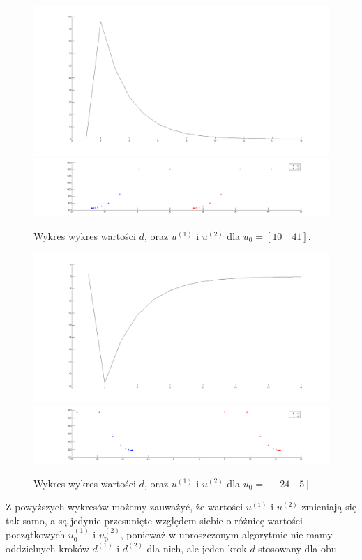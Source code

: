\documentclass[a4paper,10pt]{article}
\begin{document}
\begin{figure}[!h]
    \centering
	\includegraphics[width=120mm]{CW4-alg1fun1-u10_41-k01-d.png}
	\includegraphics[width=120mm]{CW4-alg1fun1-u10_41-k01-u.png}
	\caption{Wykres wykres wartości $d$, oraz $u^{(1)}$ i $u^{(2)}$ dla $u_0=[10 \quad 41]$.}
    \label{fig:Rysunek}
\end{figure}
\begin{figure}[!h]
    \centering
	\includegraphics[width=120mm]{CW4-alg1fun1-u-24_5-k01-d.png}
	\includegraphics[width=120mm]{CW4-alg1fun1-u-24_5-k01-u.png}
	\caption{Wykres wykres wartości $d$, oraz $u^{(1)}$ i $u^{(2)}$ dla $u_0=[-24 \quad 5]$.}
    \label{fig:Rysunek}
\end{figure}

\newpage Z powyższych wykresów możemy zauważyć, że wartości $u^{(1)}$ i $u^{(2)}$ zmieniają się tak samo, a są jedynie przesunięte względem siebie o różnicę wartości początkowych $u_0^{(1)}$ i $u_0^{(2)}$, ponieważ w uproszczonym algorytmie nie mamy oddzielnych kroków $d^{(1)}$ i $d^{(2)}$ dla nich, ale jeden krok $d$ stosowany dla obu.
\end{document}
